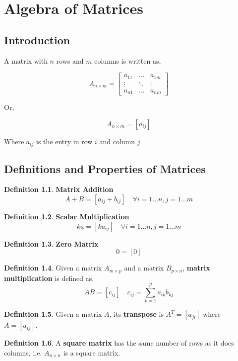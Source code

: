 \documentclass{report}
\theoremstyle{definition}
\newtheorem{_def}{Definition}
\begin{document}
\chapter{Algebra of Matrices}

\section{Introduction}

A matrix with $n$ rows and $m$ columns is written as,

\[A_{n\times m}=
\begin{bmatrix}
    a_{11} & \dots  & a_{1m} \\
    \vdots & \ddots & \vdots \\
    a_{n1} & \dots  & a_{nm}
\end{bmatrix}
\]

Or,

\[A_{n\times m}=[a_{ij}]\]

Where $a_{ij}$ is the entry in row $i$ and column $j$.

\section{Definitions and Properties of Matrices}

\begin{_def}
\textbf{Matrix Addition}
\[A+B=[a_{ij}+b_{ij}] \quad \forall i=1...n, j=1...m\]
\end{_def}

\begin{_def}
\textbf{Scalar Multiplication}
\[ka=[ka_{ij}] \quad \forall i=1...n, j=1...m\]
\end{_def}

\begin{_def}
\textbf{Zero Matrix}
\[0=[0]\]
\end{_def}

\begin{_def}
Given a matrix $A_{m\times p}$ and a matrix $B_{p\times n}$, \textbf{matrix multiplication} is defined as,
\[AB=[c_{ij}] \quad c_{ij}=\sum\limits_{k=1}^p a_{ik}b_{kj}\]
\end{_def}

\begin{_def}
Given a matrix $A$, its \textbf{transpose} is $A^T=[a_{ji}]$ where $A=[a_{ij}]$.
\end{_def}

\begin{_def}
A \textbf{square matrix} has the same number of rows as it does columns, i.e. $A_{n\times n}$ is a square matrix.
\end{_def}
\end{document}
